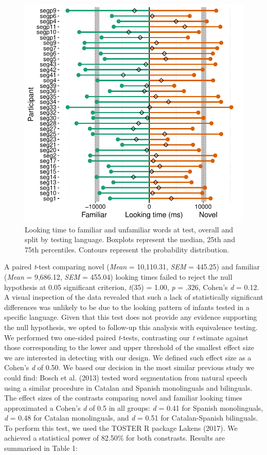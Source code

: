 \documentclass[man,floatsintext]{apa6}
\begin{document}
\begin{figure}
\includegraphics[width=1\linewidth]{segmentation_manuscript_files/figure-latex/unnamed-chunk-2-1} \caption{Looking time to familiar and unfamiliar words at test, overall and split by testing language. Boxplots represent the median, 25th and 75th percentiles. Contours represent the probability distribution.}\label{fig:unnamed-chunk-2}
\end{figure}

A paired \emph{t}-test comparing novel (\emph{Mean} = 10,110.31, \emph{SEM} = 445.25) and familiar (\emph{Mean} = 9,686.12, \emph{SEM} = 455.04) looking times failed to reject the null hypothesis at 0.05 significant criterion, \emph{t}(35) = 1.00, \emph{p} = .326, Cohen's \emph{d} = 0.12. A visual inspection of the data revealed that such a lack of statistically significant differences was unlikely to be due to the looking pattern of infants tested in a specific language. Given that this test does not provide any evidence supporting the null hypothesis, we opted to follow-up this analysis with equivalence testing. We performed two one-sided paired \emph{t}-tests, contrasting our \emph{t} estimate against those corresponding to the lower and upper threshold of the smallest effect size we are interested in detecting with our design. We defined such effect size as a Cohen's \emph{d} of 0.50. We based our decision in the most similar previous study we could find: Bosch et al. (2013) tested word segmentation from natural speech using a similar procedure in Catalan and Spanish monolinguals and bilinguals. The effect sizes of the contrasts comparing novel and familiar looking times approximated a Cohen's \emph{d} of 0.5 in all groups: \emph{d} = 0.41 for Spanish monolinguals, \emph{d} = 0.48 for Catalan monolinguals, and \emph{d} = 0.51 for Catalan-Spanish bilinguals. To perform this test, we used the TOSTER R package Lakens (2017). We achieved a statistical power of 82.50\% for both constrasts. Results are summarised in Table 1:
\end{document}
